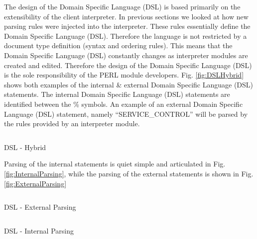 		\normalsize
		{
			The design of the Domain Specific Language (DSL) is based primarily on the extensibility of the client interpreter.  In previous
			sections we looked at how new parsing rules were injected into the interpreter.  These rules essentially define the Domain Specific Language (DSL).
			Therefore the language is not restricted by a document type definition (syntax and ordering rules).
			This means that the Domain Specific Language (DSL) constantly changes as interpreter modules are created and edited.
			Therefore the design of the Domain Specific Language (DSL) is the sole responsibility of the PERL module developers.
			\newline
			\newline
			Fig. \ref{fig:DSLHybrid} shows both examples of the internal \& external Domain Specific Language (DSL) statements.
			The internal Domain Specific Language (DSL) statements are identified between the \% symbols.
			An example of an external Domain Specific Language (DSL) statement, namely ``SERVICE\_CONTROL'' will be parsed by the rules
			provided by an interpreter module.
		}
		
		\vspace{2mm}
		\begin{figurehere}
			\inputminted[linenos=true,fontsize=\footnotesize,tabsize=2]{perl}{pages/chapter3/smippets/dsl2}
			\vspace{-5mm}
			\caption{DSL - Hybrid}
			\label{fig:DSLHybrid}
		\end{figurehere}	
		
		\vspace{2mm}
		\normalsize
		{
			Parsing of the internal statements is quiet simple and articulated in Fig. \ref{fig:InternalParsing},
			while the parsing of the external statements is shown in Fig. \ref{fig:ExternalParsing}
		}
		
		\vspace{2mm}
		\begin{figurehere}
			\inputminted[linenos=true,fontsize=\footnotesize,tabsize=2]{perl}{pages/chapter3/smippets/pe.txt}
			\vspace{-5mm}
			\caption{DSL - External Parsing}
			\label{fig:ExternalParsing}
		\end{figurehere}

\newpage		

		\vspace{4mm}
		\begin{figurehere}
			\inputminted[linenos=true,fontsize=\footnotesize,tabsize=2]{perl}{pages/chapter3/smippets/pi.txt}
			\vspace{-5mm}
			\caption{DSL - Internal Parsing}
			\label{fig:InternalParsing}
		\end{figurehere}			
	
